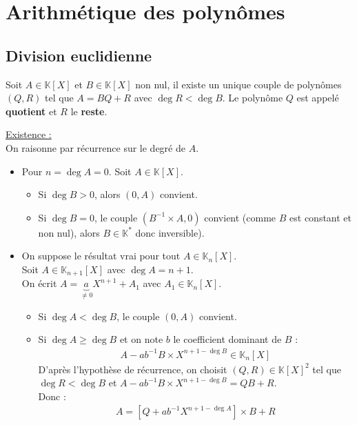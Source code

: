 \documentclass[../main.tex]{subfiles}
\begin{document}
\setcounter{chapter}{15}
\chapter{Arithmétique des polynômes}
\tableofcontents
\clearpage

\section{Division euclidienne}
\begin{tcolorbox}[title=Théorème 16.1, title filled=false, colframe=orange, colback=orange!10!white]
    Soit $A \in \mathbb{K}[X]$ et $B \in \mathbb{K}[X]$ non nul, il existe un unique couple de polynômes $(Q,R)$ tel que $A = BQ + R$ avec $\deg R < \deg B$. Le polynôme $Q$ est appelé \textbf{quotient} et $R$ le \textbf{reste}. 
\end{tcolorbox}

\noindent \underline{Existence :} \\
On raisonne par récurrence sur le degré de $A$. \\
\begin{itemize}
    \item Pour $n = \deg A = 0$. Soit $A \in \mathbb{K}[X]$.
    \begin{itemize}
        \item Si $\deg B > 0$, alors $(0, A)$ convient. \\
        \item Si $\deg B = 0$, le couple $(B^{-1} \times A, 0)$ convient (comme $B$ est constant et non nul), alors $B \in \mathbb{K}^*$ donc inversible). \\
    \end{itemize}

    \item On suppose le résultat vrai pour tout $A \in \mathbb{K}_n[X]$. \\
    Soit $A \in \mathbb{K}_{n+1}[X]$ avec $\deg A = n+1$. \\
    On écrit $A = \underbrace{a}_{\neq 0} X^{n+1} + A_1$ avec $A_1 \in \mathbb{K}_n[X]$. 
    \begin{itemize}
        \item Si $\deg A < \deg B$, le couple $(0, A)$ convient. 
        \item Si $\deg A \geq \deg B$ et on note $b$ le coefficient dominant de $B$ : 
        \begin{align*}
            A - ab^{-1} B \times X^{n+1 - \deg B} \in \mathbb{K}_n[X]
        \end{align*}
        D'après l'hypothèse de récurrence, on choisit $(Q, R) \in \mathbb{K}[X]^2$ tel que $\deg R < \deg B$ et $A - ab^{-1} B \times X^{n+1 - \deg B} = QB + R$. \\
        Donc : 
        \begin{align*}
            A = \left[ Q + ab^{-1}X^{n+1 - \deg A} \right] \times B + R
        \end{align*}
    \end{itemize}
\end{itemize}
\end{document}
